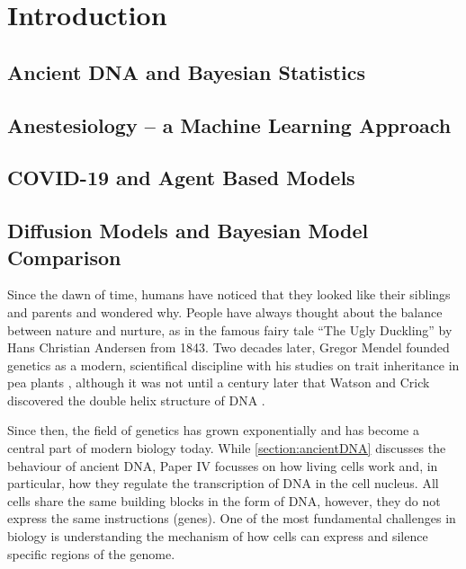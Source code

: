 
\chapter{Introduction}



\section{Ancient DNA and Bayesian Statistics}
\label{section:ancientDNA}



\section{Anestesiology -- a Machine Learning Approach }
\label{section:machine-learning}


\section{COVID-19 and Agent Based Models}
\label{section:agent-based-models}


\section{Diffusion Models and Bayesian Model Comparison}
\label{section:diffusion}

Since the dawn of time, humans have noticed that they looked like their siblings and parents and wondered why. People have always thought about the balance between nature and nurture, as in the famous fairy tale ``The Ugly Duckling'' by Hans Christian Andersen from 1843. Two decades later, Gregor Mendel founded genetics as a modern, scientifical discipline with his studies on trait inheritance in pea plants \autocite{mendelgregorVersucheUberPflanzenhybriden1866}, although it was not until a century later that Watson and Crick discovered the double helix structure of DNA \autocite{watsonMolecularStructureNucleic1953}.

Since then, the field of genetics has grown exponentially and has become a central part of modern biology today. While \autoref{section:ancientDNA} discusses the behaviour of ancient DNA, Paper IV focusses on how living cells work and, in particular, how they regulate the transcription of DNA in the cell nucleus. All cells share the same building blocks in the form of DNA, however, they do not express the same instructions (genes). One of the most fundamental challenges in biology is understanding the mechanism of how cells can express and silence specific regions of the genome.

